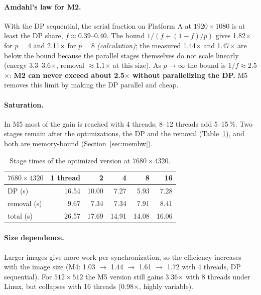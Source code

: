 \documentclass[11pt,a4paper]{article}
\newcommand{\x}{\ensuremath{\times}}
\newcommand{\calc}{\emph{(calculation)}}
\begin{document}
\paragraph{Amdahl's law for M2.} With the DP sequential, the serial fraction on Platform A at
$1920\times1080$ is at least the DP share, $f\approx0.39$--$0.40$. The bound $1/(f+(1-f)/p)$ gives 1.82\x{}
for $p=4$ and 2.11\x{} for $p=8$ \calc; the measured 1.44\x{} and 1.47\x{} are below the bound because the
parallel stages themselves do not scale linearly (energy 3.3--3.6\x, removal $\approx1.1$\x{} at this
size). As $p\to\infty$ the bound is $1/f\approx2.5$\x: \textbf{M2 can never exceed about 2.5\x{} without
parallelizing the DP.} M5 removes this limit by making the DP parallel and cheap.

\paragraph{Saturation.} In M5 most of the gain is reached with 4 threads; 8--12 threads add 5--15\,\%. Two
stages remain after the optimizations, the DP and the removal (Table~\ref{tab:stages8k}), and both are
memory-bound (Section~\ref{sec:membw}).

\begin{table}[ht]
\centering\small
\begin{tabular}{@{}lrrrrr@{}}
\toprule
$7680\times4320$ & 1 thread & 2 & 4 & 8 & 16 \\
\midrule
DP (s) & 16.54 & 10.00 & 7.27 & 5.93 & 7.28 \\
removal (s) & 9.67 & 7.34 & 7.34 & 7.91 & 8.41 \\
total (s) & 26.57 & 17.69 & 14.91 & 14.08 & 16.06 \\
\bottomrule
\end{tabular}
\caption{Stage times of the optimized version at $7680\times4320$.}
\label{tab:stages8k}
\end{table}

\paragraph{Size dependence.} Larger images give more work per synchronization, so the efficiency increases
with the image size (M4: 1.03 $\to$ 1.44 $\to$ 1.61 $\to$ 1.72 with 4 threads, DP sequential). For
$512\times512$ the M5 version still gains 3.36\x{} with 8 threads under Linux, but collapses with 16
threads (0.98\x, highly variable).

\end{document}
